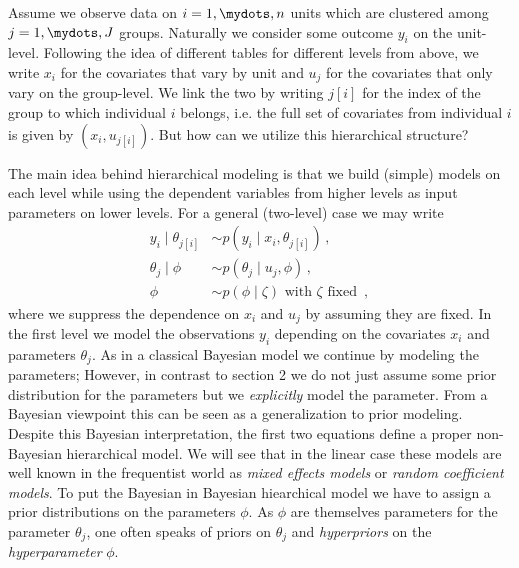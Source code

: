 \noindent
Assume we observe data on $i=1,\mydots,n$ units which are clustered among $j=1,\mydots,J$ groups.
Naturally we consider some outcome $y_i$ on the unit-level.
Following the idea of different tables for different levels from above, we write $x_i$ for the covariates that vary by unit and $u_j$ for the covariates that only vary on the group-level.
We link the two by writing $j[i]$ for the index of the group to which individual $i$ belongs, i.e. the full set of covariates from individual $i$ is given by $(x_i, u_{j[i]})$. But how can we utilize this hierarchical structure?

The main idea behind hierarchical modeling is that we build (simple) models on each level while using the dependent variables from higher levels as input parameters on lower levels.
For a general (two-level) case we may write
\begin{align}
  y_i \mid \theta_{j[i]} &\sim p(y_i \mid x_i, \theta_{j[i]}) \,,\\
  \theta_j \mid \phi &\sim p(\theta_j \mid u_j, \phi) \,,\\
  \phi &\sim p(\phi \mid \zeta) \text{ with } \zeta \text{ fixed } \,,
\end{align}
where we suppress the dependence on $x_i$ and $u_j$ by assuming they are fixed.
In the first level we model the observations $y_i$ depending on the covariates $x_i$ and parameters $\theta_j$.
As in a classical Bayesian model we continue by modeling the parameters; However, in contrast to section 2 we do not just assume some prior distribution for the parameters but we \emph{explicitly} model the parameter.
From a Bayesian viewpoint this can be seen as a generalization to prior modeling.
Despite this Bayesian interpretation, the first two equations define a proper non-Bayesian hierarchical model.
We will see that in the linear case these models are well known in the frequentist world as \emph{mixed effects models} or \emph{random coefficient models}.
To put the Bayesian in Bayesian hiearchical model we have to assign a prior distributions on the parameters $\phi$.
As $\phi$ are themselves parameters for the parameter $\theta_j$, one often speaks of priors on $\theta_j$ and \emph{hyperpriors} on the \emph{hyperparameter} $\phi$.

